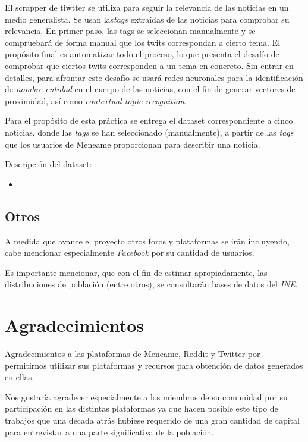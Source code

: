\documentclass[a4paper,12pt]{article}
\begin{document}
El scrapper de tiwtter se utiliza para seguir la relevancia de las noticias en un medio generalista. Se usan las{\itshape tags} extra\'idas de las noticias para comprobar su relevancia. En primer paso, las tags se seleccionan manualmente y se compruebar\'a de forma manual que los twits correspondan a cierto tema. El prop\'osito final es automatizar todo el proceso, lo que presenta el desaf\'io de comprobar que ciertos twits corresponden a un tema en concreto. Sin entrar en detalles, para afrontar este desaf\'io se usar\'a redes neuronales para la identificaci\'on de {\itshape nombre-entidad} en el cuerpo de las noticias, con el fin de generar vectores de proximidad, as\'i como {\itshape contextual topic recognition}.

Para el prop\'osito de esta pr\'actica se entrega el dataset correspondiente a cinco noticias, donde las {\itshape tags} se han seleccionado (manualmente), a partir de las {\itshape tags} que los usuarios de Meneame proporcionan para describir una noticia.

Descripci\'on del dataset:

\begin{itemize}

\item

\end{itemize}

\subsection{Otros}

A medida que avance el proyecto otros foros y plataformas se ir\'an incluyendo, cabe mencionar especialmente {\itshape Facebook} por su cantidad de usuarios.

Es importante mencionar, que con el fin de estimar apropiadamente, las distribuciones de poblaci\'on (entre otros), se consultar\'an bases de datos del {\itshape INE}. 

\section{Agradecimientos}

Agradecimientos a las plataformas de Meneame, Reddit y Twitter por permitirnos utilizar sus plataformas y recursos para obtenci\'on de datos generados en ellas.

Nos gustar\'ia agradecer especialmente a los miembros de su comunidad por su participaci\'on en las distintas plataformas ya que hacen posible este tipo de trabajos que una d\'ecada atr\'as hubiese requerido de una gran cantidad de capital para entrevistar a una parte significativa de la poblaci\'on.
\end{document}
